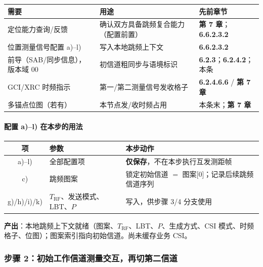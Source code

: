 \documentclass[11pt,a4paper]{ctexart}
\begin{document}
\begin{center}
\small
\begin{tabular}{|L{3.5cm}|L{4.5cm}|L{5cm}|}
\hline
\textbf{需要} & \textbf{用途} & \textbf{先前章节} \\
\hline
定位能力查询/反馈 & 确认双方具备跳频复合能力（配置前置） & \textbf{第 7 章}；\textbf{6.6.2.3.2} \\
\hline
位置测量信号配置 a)--l) & 写入本地跳频上下文 & \textbf{6.6.2.3.2} \\
\hline
前导（SAB/同步信息），版本域 00 & 初信道粗同步与语境标识 & \textbf{6.2.3}；\textbf{6.2.4.2}；本条 \\
\hline
GCI/XRC 时频指示 & 第一/第二测量信号发收格子 & \textbf{6.2.4.6.6} / \textbf{第 7 章} \\
\hline
多锚点位图（若有） & 本节点发/收时频占用 & 本条末；\textbf{第 7 章} \\
\hline
\end{tabular}
\end{center}

\paragraph{配置 a)--l) 在本步的用法}
\begin{center}
\small
\begin{tabular}{|c|L{3.2cm}|L{9cm}|}
\hline
\textbf{项} & \textbf{参数} & \textbf{本步动作} \\
\hline
a)--l) & 全部配置项 & \textbf{仅保存}，不在本步执行互发测距帧 \\
\hline
c) & 跳频图案 & 锁定初始信道 $=$ 图案[0]；记录后续跳频信道序列 \\
\hline
g)/h)/i)/k) & $T_{\mathrm{RF}}$、发送模式、LBT、$P$ & 写入，供步骤 3/4 分支使用 \\
\hline
\end{tabular}
\end{center}

\textbf{产出}：本地跳频上下文就绪（图案、$T_{\mathrm{RF}}$、LBT、$P$、生成方式、CSI 模式、时频格子、位图）；图案索引指向初始信道。尚未缓存业务 CSI。

\subsubsection*{步骤 2：初始工作信道测量交互，再切第二信道}
\end{document}
